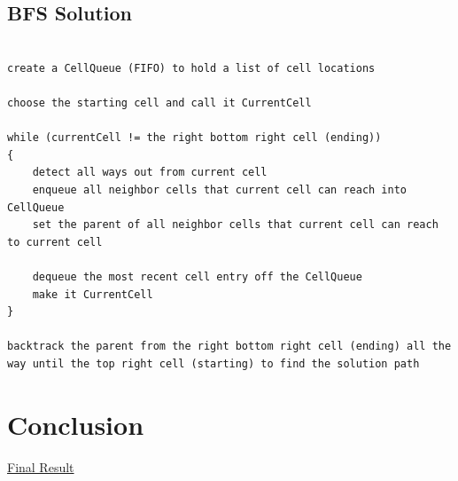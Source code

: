 \documentclass{article}
\begin{document}
\subsection*{BFS Solution}
\begin{lstlisting}

create a CellQueue (FIFO) to hold a list of cell locations

choose the starting cell and call it CurrentCell

while (currentCell != the right bottom right cell (ending))
{
	detect all ways out from current cell
	enqueue all neighbor cells that current cell can reach into CellQueue
	set the parent of all neighbor cells that current cell can reach to current cell
	
	dequeue the most recent cell entry off the CellQueue
	make it CurrentCell 
}

backtrack the parent from the right bottom right cell (ending) all the way until the top right cell (starting) to find the solution path
\end{lstlisting}

\section{Conclusion} 

\href{run:final_result.txt}{Final Result}
\end{document}
